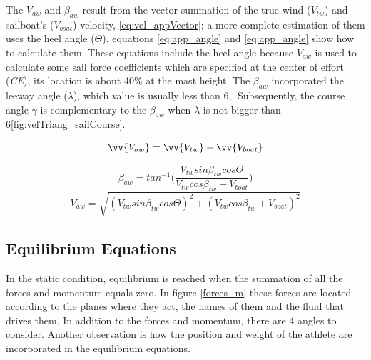 

The $V_{aw}$ and $\beta_{aw}$ result from the vector summation of the true wind ($V_{tw}$) and sailboat's ($V_{boat}$) velocity, \ref{eq:vel_appVector}; a more complete estimation of them uses the heel angle ($\Theta$), equations \ref{eq:app_angle} and \ref{eq:app_angle} show how to calculate them. These equations include the heel angle because $V_{aw}$ is used to calculate some sail force coefficients which are specified at the center of effort (\textit{CE}), its location is about 40\% at the mast height. The $\beta_{aw}$ incorporated the leeway angle ($\lambda$), which value is usually less than 6\degree \cite{philpott1993yacht},\cite{claughton1998sailing}. Subsequently, the course angle $\gamma$ is complementary to the $\beta_{aw}$ when $\lambda$ is not bigger than 6\degree \ref{fig:velTriang_sailCourse}. \par
\begin{equation}\label{eq:vel_appVector}
    \vv{V_{aw}}=\vv{V_{tw}}-\vv{V_{boat}}
\end{equation}

\begin{equation} \label{eq:app_angle}
    \beta_{aw}=tan^{-1} \bigg( \frac{ V_{tw} sin \beta_{tw} cos \Theta }{ V_{tw} cos \beta_{tw} + V_{boat}} \bigg)
\end{equation}
\newline
\begin{equation} \label{eq:ap_vel}
    V_{aw}=  \sqrt{ (V_{tw} sin \beta_{tw} cos \Theta)^2 + (V_{tw} cos \beta_{tw} + V_{boat})^2}
\end{equation}
\subsection {Equilibrium Equations} \label{sec:equil_equat}
In the static condition, equilibrium is reached when the summation of all the forces and momentum equals zero. In figure \ref{forces_m} these forces are located according to the planes where they act, the names of them and the fluid that drives them. In addition to the forces and momentum, there are 4 angles to consider. Another observation is how the position and weight of the athlete are incorporated in the equilibrium equations. \par 

